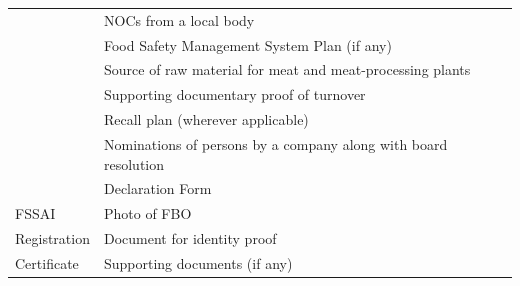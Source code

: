 \documentclass[a4paper, 12pt]{article}
\newcommand\tabitem{\makebox[1em][r]{\textbullet~}}
\begin{document}
\begin{longtable}{>{\raggedright}p{2.5cm}>{\raggedright\arraybackslash}p{13cm}}
          & \tabitem NOCs from a local body \\
          & \tabitem Food Safety Management System Plan (if any) \\
          & \tabitem Source of raw material for meat and meat-processing plants \\
          & \tabitem Supporting documentary proof of turnover \\
          & \tabitem Recall plan (wherever applicable) \\
          & \tabitem Nominations of persons by a company along with board resolution \\
          & \tabitem Declaration Form \\
    \midrule
    FSSAI & \tabitem Photo of FBO \\
    Registration & \tabitem  Document for identity proof \\
    Certificate & \tabitem Supporting documents (if any) \\
    \end{longtable}%
  \label{tab:addlabel}%
\normalsize
\newpage

\newpage
\end{document}
